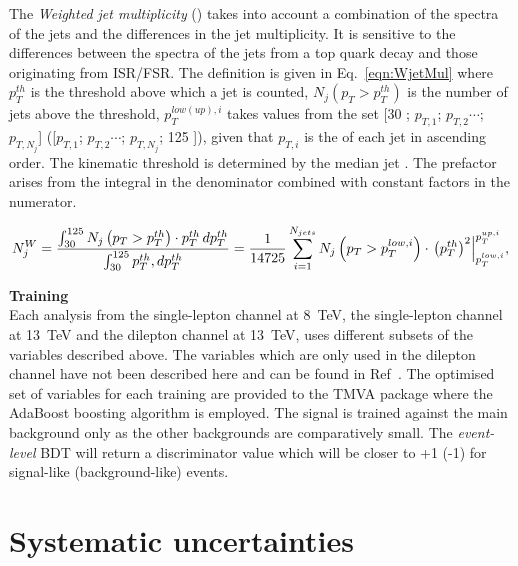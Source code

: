 The \emph{Weighted jet multiplicity} (\njetsw) takes into account a combination of the \pt spectra of the jets and the differences in the jet multiplicity. It is sensitive to the differences between the \pt spectra of the jets from a top quark decay and those originating from ISR/FSR. The \njetsw definition is given in Eq.~\ref{eqn:WjetMul} where $p_T^{th}$ is the \pt threshold above which a jet is counted, $N_j\left(p_T > p_T^{th}\right)$ is the number of jets above the \pt threshold, $p_T^{low(up),i}$ takes values from the set [30 \GeV; $p_{T,1}$; $p_{T,2}\cdots$; $p_{T,N_j}$] ([$p_{T,1}$; $p_{T,2}\cdots$; $p_{T,N_j}$; 125 \GeV]), given that $p_{T,i}$ is the \pt of each jet in ascending order. The kinematic threshold is determined by the median jet \pt. The prefactor arises from the integral in the denominator combined with constant factors in the numerator.

\begin{equation}
N_j^W = \frac{\int_{30}^{125}{N_j\left(p_T > p_T^{th}\right)\cdot p_T^{th}\,dp_T^{th}}} {\int_{30}^{125}{ p_T^{th}\\
,dp_T^{th}}} = \frac{1}{14725}\sum_{i=1}^{N_{jets}}{N_j\left(p_T>p_T^{low,i}\right)\cdot\left.\left(p_T^{th}\right)^2\right|^{p_T^{up,i}}_{p_T^{low,i}}},  
\label{eqn:WjetMul}
\end{equation} 


\textbf{Training}\\
Each analysis from the single-lepton channel at 8~TeV, the single-lepton channel at 13~TeV and the dilepton channel at 13~TeV, uses different subsets of the variables described above. The variables which are only used in the dilepton channel have not been described here and can be found in Ref~\cite{CMS-PAS-TOP-16-016}. The optimised set of variables for each training are provided to the TMVA package where the AdaBoost boosting algorithm is employed. The \tttt signal is trained against the main \ttbar background only as the other backgrounds are comparatively small. The \emph{event-level} BDT will return a discriminator value which will be closer to +1 (-1) for signal-like (background-like) events.

\section{Systematic uncertainties}
\label{sec:uncertainties}

